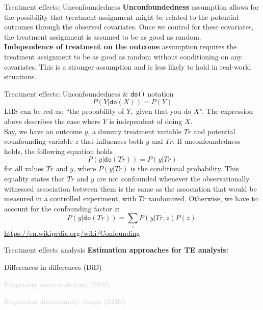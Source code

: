 \documentclass{beamer}
\begin{document}
\begin{frame}{Treatment effects: Unconfoundedness}
\textbf{Unconfoundedness} assumption allows for the possibility that treatment assignment might be related to the potential outcomes through the observed covariates. Once we control for these covariates, the treatment assignment is assumed to be as good as random. \\
\bigskip
\textbf{Independence of treatment on the outcome} assumption requires the treatment assignment to be as good as random without conditioning on any covariates. This is a stronger assumption and is less likely to hold in real-world situations.
\end{frame}
\begin{frame}{Treatment effects: Unconfoundedness \& \texttt{do()} notation}
\small 
$$P(Y|\texttt{do}(X)) = P(Y)$$ 
LHS can be red as: ``the probability of $Y,$ given that you do  $X$''. The expression above describes the case where $Y$ is independent of doing $X$.\\
\bigskip
Say, we have an outcome $y$, a dummy treatment variable $\textit{Tr}$ and potential counfounding variable $z$ that influences both $y$ and $\textit{Tr}$. If unconfoundedness holds, the following equation holds
$$P(y | \texttt{do}(\textit{Tr})) = P(y|\textit{Tr})$$
for all values $\textit{Tr}$ and $y$, where $P(y|\textit{Tr})$ is the conditional probability. This equality states that $\textit{Tr}$ and $y$ are not confounded whenever the observationally witnessed association between them is the same as the association that would be measured in a controlled experiment, with $\textit{Tr}$ randomized. Otherwise, we have to account for the confounding factor $z$:
$$P(y | \texttt{do}(\textit{Tr})) = \sum_z P(y|\textit{Tr},z)P(z). $$
\centering
\url{https://en.wikipedia.org/wiki/Confounding}
\end{frame}
\begin{frame}{Treatment effects analysis}
\textbf{Estimation approaches for TE analysis:}\\
\bigskip
\begin{enumerate}
    \item Differences in differences (DiD)
    \bigskip
    \item \textcolor{lightgray}{Propensity score matching (PSM)
    \bigskip
    \item Regression discontinuity design (RDD)}
\end{enumerate}
\end{frame}
\end{document}

